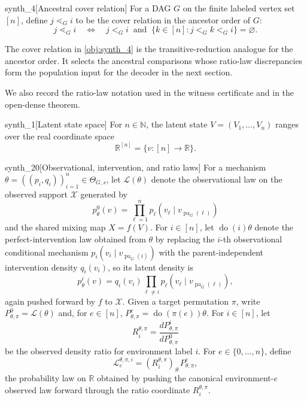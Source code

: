 \documentclass[11pt]{article}
\begin{document}
\begin{definitionv}{synth_4}[Ancestral cover relation]
For a DAG \(G\) on the finite labeled vertex set \([n]\), define \(j\lessdot_G i\) to be the cover relation in the ancestor order of \(G\):
\[
j\lessdot_G i
\quad\Longleftrightarrow\quad
j <_G i
\;\;\text{and}\;\;
\{k\in[n]: j <_G k <_G i\}=\varnothing .
\]
\end{definitionv}

The cover relation in \cref{obj:synth_4} is the transitive-reduction analogue for the ancestor order. It selects the ancestral comparisons whose ratio-law discrepancies form the population input for the decoder in the next section.

We also record the ratio-law notation used in the witness certificate and in the open-dense theorem.

\begin{definitionv}{synth_1}[Latent state space]
For \(n\in\mathbb N\), the latent state \(V=(V_1,\ldots,V_n)\) ranges over the real coordinate space
\[
\mathbb R^{[n]}=\{v:[n]\to\mathbb R\}.
\]
\end{definitionv}

\begin{definitionv}{synth_20}[Observational, intervention, and ratio laws]
For a mechanism \(\theta=((p_i,q_i))_{i=1}^n\in\Theta_{G,s}\), let \(\mathcal L(\theta)\) denote the observational law on the observed support \(\mathcal X\) generated by
\[
p^0_\theta(v)=\prod_{\ell=1}^n p_\ell(v_\ell\mid v_{\operatorname{pa}_G(\ell)})
\]
and the shared mixing map \(X=f(V)\). For \(i\in[n]\), let \(\operatorname{do}(i)\theta\) denote the perfect-intervention law obtained from \(\theta\) by replacing the \(i\)-th observational conditional mechanism \(p_i(v_i\mid v_{\operatorname{pa}_G(i)})\) with the parent-independent intervention density \(q_i(v_i)\), so its latent density is
\[
p^i_\theta(v)=q_i(v_i)\prod_{\ell\ne i}p_\ell(v_\ell\mid v_{\operatorname{pa}_G(\ell)}),
\]
again pushed forward by \(f\) to \(\mathcal X\). Given a target permutation \(\pi\), write \(P^0_{\theta,\pi}=\mathcal L(\theta)\) and, for \(e\in[n]\), \(P^e_{\theta,\pi}=\operatorname{do}(\pi(e))\theta\). For \(i\in[n]\), let
\[
R_i^{\theta,\pi}=\frac{dP^i_{\theta,\pi}}{dP^0_{\theta,\pi}}
\]
be the observed density ratio for environment label \(i\). For \(e\in\{0,\ldots,n\}\), define
\[
\mathcal L_e^{\theta,\pi,i}
  = (R_i^{\theta,\pi})_{\#}P^e_{\theta,\pi},
\]
the probability law on \(\mathbb R\) obtained by pushing the canonical environment-\(e\) observed law forward through the ratio coordinate \(R_i^{\theta,\pi}\).
\end{definitionv}
\end{document}

